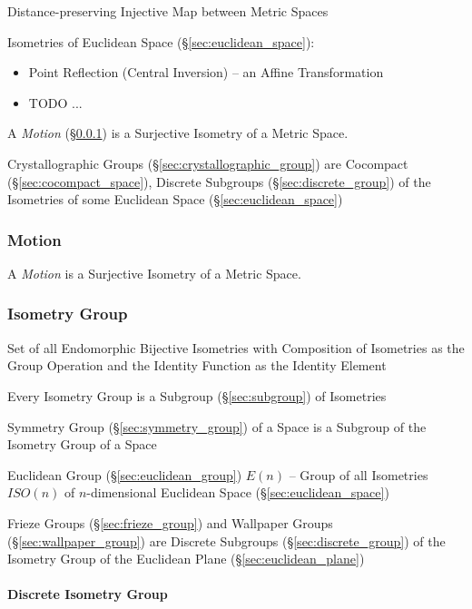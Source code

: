 Distance-preserving Injective Map between Metric Spaces

Isometries of Euclidean Space (\S\ref{sec:euclidean_space}):
\begin{itemize}
  \item Point Reflection (Central Inversion) -- an Affine Transformation
  \item TODO
  ...
\end{itemize}

A \emph{Motion} (\S\ref{sec:motion}) is a Surjective Isometry of a Metric
Space.

Crystallographic Groups (\S\ref{sec:crystallographic_group}) are Cocompact
(\S\ref{sec:cocompact_space}), Discrete Subgroups (\S\ref{sec:discrete_group})
of the Isometries of some Euclidean Space (\S\ref{sec:euclidean_space})



\subsubsection{Motion}\label{sec:motion}


A \emph{Motion} is a Surjective Isometry of a Metric Space.



\subsubsection{Isometry Group}\label{sec:isometry_group}

Set of all Endomorphic Bijective Isometries with Composition of
Isometries as the Group Operation and the Identity Function as the
Identity Element

Every Isometry Group is a Subgroup (\S\ref{sec:subgroup}) of Isometries

Symmetry Group (\S\ref{sec:symmetry_group}) of a Space is a Subgroup
of the Isometry Group of a Space

Euclidean Group (\S\ref{sec:euclidean_group}) $E(n)$ -- Group of all
Isometries $ISO(n)$ of $n$-dimensional Euclidean Space
(\S\ref{sec:euclidean_space})

Frieze Groups (\S\ref{sec:frieze_group}) and Wallpaper Groups
(\S\ref{sec:wallpaper_group}) are Discrete Subgroups
(\S\ref{sec:discrete_group}) of the Isometry Group of the Euclidean Plane
(\S\ref{sec:euclidean_plane})



\paragraph{Discrete Isometry Group}\label{sec:discrete_isometry_group}\hfill

